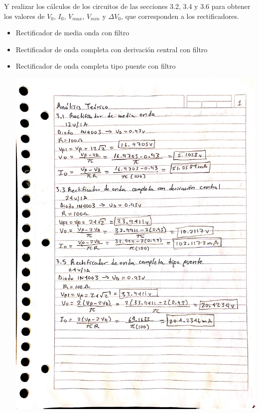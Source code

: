\documentclass[12pt]{article}
\begin{document}
       Y realizar los cálculos de los circuitos de las secciones 3.2, 3.4 y 3.6 para obtener los valores de $V_0$,
       $I_0$, $V_{max}$, $V_{min}$ y $\Delta V_0$, que corresponden a los rectificadores.
       \begin{itemize}
           \item Rectificador de media onda con filtro
           \item Rectificador de onda completa con derivación central con filtro
           \item Rectificador de onda completa tipo puente con filtro
        \label{sec:calculos}
        \begin{center}
            \includegraphics*[scale=0.2]{an1.jpg}\newpage

\end{center}
\end{itemize}
\end{document}
